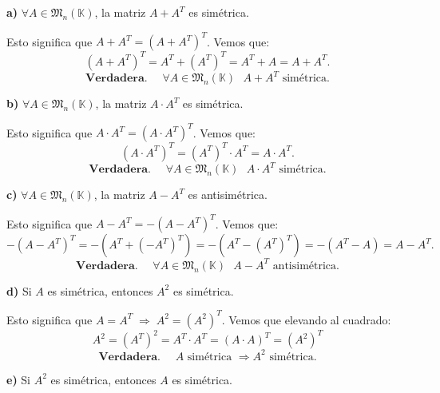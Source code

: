 \documentclass[a4paper,12pt]{article}
\begin{document}
\begin{ejercicio}[title=Ejercicio 42 (⋆)]

\textbf{a)} $\forall A \in \mathfrak{M}_n(\mathbb{K})$, la matriz $A + A^T$ es simétrica.

\vspace{0.5em}

Esto significa que $A + A^T = (A + A^T)^T$.  
Vemos que:
\[
(A + A^T)^T = A^T + (A^T)^T = A^T + A = A + A^T.
\]
\[
\boxed{\textbf{Verdadera. }\quad  \forall A \in \mathfrak{M}_n(\mathbb{K})\,\,\,\, A + A^T \text{ simétrica.}}
\]

\vspace{1em}

\textbf{b)} $\forall A \in \mathfrak{M}_n(\mathbb{K})$, la matriz $A \cdot A^T$ es simétrica.

\vspace{0.5em}

Esto significa que $A \cdot A^T = (A \cdot A^T)^T$.  
Vemos que:
\[
(A \cdot A^T)^T = (A^T)^T \cdot A^T = A \cdot A^T.
\]
\[
\boxed{\textbf{Verdadera. }\quad  \forall A \in \mathfrak{M}_n(\mathbb{K})\,\,\,\, A \cdot A^T \text{ simétrica.}}
\]

\vspace{1em}

\textbf{c)} $\forall A \in \mathfrak{M}_n(\mathbb{K})$, la matriz $A - A^T$ es antisimétrica.

\vspace{0.5em}

Esto significa que $A - A^T = -(A - A^T)^T$.  
Vemos que:
\[
-(A - A^T)^T = -(A^T + (-A^T)^T) = -(A^T - (A^T)^T) = -(A^T - A) = A - A^T.
\]
\[
\boxed{\textbf{Verdadera. }\quad  \forall A \in \mathfrak{M}_n(\mathbb{K})\,\,\,\, A - A^T \text{ antisimétrica.}}
\]

\vspace{1em}

\textbf{d)} Si $A$ es simétrica, entonces $A^2$ es simétrica.

\vspace{0.5em}

Esto significa que $A = A^T \;\Rightarrow\; A^2 = (A^2)^T$.
Vemos que elevando al cuadrado:
\[
A^2 = (A^T)^2 = A^T \cdot A^T = (A \cdot A)^T = (A^2)^T
\]
\[
\boxed{\textbf{Verdadera. }\quad A \text{ simétrica } \Rightarrow A^2 \text{ simétrica.}}
\]

\vspace{1em}

\textbf{e)} Si $A^2$ es simétrica, entonces $A$ es simétrica.


\end{ejercicio}
\end{document}
